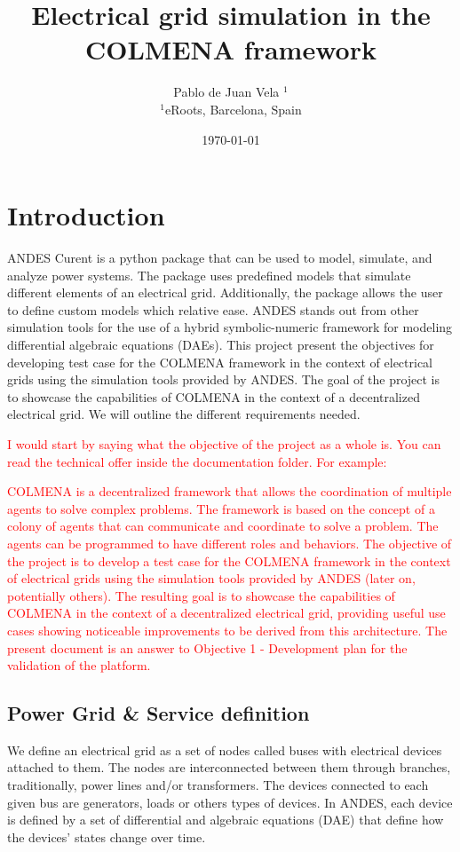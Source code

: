 \documentclass{article}
\title{Electrical grid simulation in the COLMENA framework}
\author{Pablo de Juan Vela $^{1}$ \\
        \small $^{1}$eRoots, Barcelona, Spain \\
}
\date{\today}
\begin{document}
\maketitle

\section{Introduction}
ANDES Curent \cite{grids:models} is a python package that can be used to model, simulate, and analyze power systems. The package uses predefined models that simulate different elements of an electrical grid. Additionally, the package allows the user to define custom models which relative ease. ANDES stands out from other simulation tools for the use of a hybrid symbolic-numeric framework for modeling differential algebraic equations (DAEs). This project present the objectives for developing test case for the COLMENA framework in the context of electrical grids using the simulation tools provided by ANDES. The goal of the project is to showcase the capabilities of COLMENA in the context of a decentralized electrical grid. We will outline the different requirements needed. 

\textcolor{red}{I would start by saying what the objective of the project as a whole is. You can read the technical offer inside the documentation folder. For example:}

\textcolor{red}{COLMENA is a decentralized framework that allows the coordination of multiple agents to solve complex problems. The framework is based on the concept of a colony of agents that can communicate and coordinate to solve a problem. The agents can be programmed to have different roles and behaviors. The objective of the project is to develop a test case for the COLMENA framework in the context of electrical grids using the simulation tools provided by ANDES (later on, potentially others). The resulting goal is to showcase the capabilities of COLMENA in the context of a decentralized electrical grid, providing useful use cases showing noticeable improvements to be derived from this architecture. The present document is an answer to Objective 1 - Development plan for the validation of the platform.}

\subsection{Power Grid \& Service definition}
We define an electrical grid as a set of nodes called buses with electrical devices attached to them. The nodes are interconnected between them through branches, traditionally, power lines and/or transformers. The devices connected to each given bus are generators, loads or others types of devices. In ANDES, each device is defined by a set of differential and algebraic equations (DAE) that define how the devices' states change over time.
\end{document}
